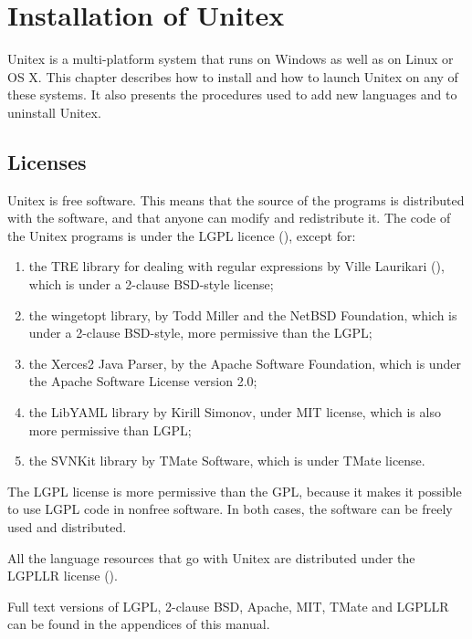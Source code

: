 \chapter{Installation of Unitex}
\label{chap-install}

Unitex is a multi-platform system that runs on Windows as well as on Linux or
OS X. This chapter describes how to install and how to launch Unitex on any of
these systems. It also presents the procedures used to add new languages and to
uninstall Unitex.

\section{Licenses}
\label{section-licences}
Unitex is free software. This means that the source of the programs is
distributed with the software, and that anyone can modify and redistribute it.
The code of the Unitex programs is under the LGPL licence (\cite{LGPL}), except
for:

\begin{enumerate}
\item the TRE library for dealing with regular expressions by Ville Laurikari
(\cite{TRE}), which is under a 2-clause BSD-style license;

\item the wingetopt library, by Todd Miller and the NetBSD Foundation,
 which is under a 2-clause BSD-style, more permissive than the LGPL;

\item the Xerces2 Java Parser, by the Apache Software Foundation, which is under the Apache Software License version 2.0;

\item  the LibYAML library by Kirill Simonov, under MIT license, which is 
also more permissive than LGPL;

\item the SVNKit library by TMate Software, which is under TMate license.
\end{enumerate}

\noindent The LGPL license is more permissive than the GPL,
because it makes it possible to use LGPL code in nonfree software. 
In both cases, the software can be freely used and distributed.

\bigskip
\noindent All the language resources that go with Unitex are distributed under the LGPLLR
license  (\cite{LGPLLR}).

\bigskip
\noindent Full text versions of LGPL, 2-clause BSD, Apache, MIT, TMate and LGPLLR can be found in
the appendices of this manual.

